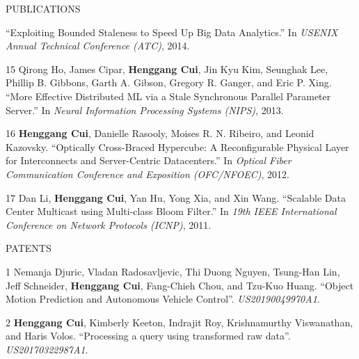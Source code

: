 \documentclass{resume} %
\begin{document}
\begin{rSection}{PUBLICATIONS}
{        ``Exploiting Bounded Staleness to Speed Up Big Data Analytics.''
        In \emph{USENIX Annual Technical Conference (ATC)}, 2014.
    \item
    [15]
        Qirong Ho, James Cipar, {\bf Henggang Cui}, Jin Kyu Kim, Seunghak Lee, Phillip B. Gibbons, Garth A. Gibson, Gregory R. Ganger, and Eric P. Xing.
        ``More Effective Distributed ML via a Stale Synchronous Parallel Parameter Server.''
        In \emph{Neural Information Processing Systems (NIPS)}, 2013.
    \item
    [16]
        {\bf Henggang Cui}, Danielle Rasooly, Moises R. N. Ribeiro, and Leonid Kazovsky.
        ``Optically Cross-Braced Hypercube: A Reconfigurable Physical Layer for Interconnects and Server-Centric Datacenters.''
        In \emph{Optical Fiber Communication Conference and Exposition (OFC/NFOEC)}, 2012.
    \item
    [17]
        Dan Li, {\bf Henggang Cui}, Yan Hu, Yong Xia, and Xin Wang.
        ``Scalable Data Center Multicast using Multi-class Bloom Filter.''
        In \emph{19th IEEE International Conference on Network Protocols (ICNP)}, 2011.
}
\end{rSection}
\vspace{-.05in}



\begin{rSection}{PATENTS}
\vspace{-.1in}
\small{
    \item
    [1]
        Nemanja Djuric, Vladan Radosavljevic, Thi Duong Nguyen, Tsung-Han Lin, Jeff Schneider, {\bf Henggang Cui}, Fang-Chieh Chou, and Tzu-Kuo Huang.
        ``Object Motion Prediction and Autonomous Vehicle Control''.
        \emph{US20190049970A1}.
    \item
    [2]
        {\bf Henggang Cui}, Kimberly Keeton, Indrajit Roy, Krishnamurthy Viswanathan, and Haris Volos.
        ``Processing a query using transformed raw data''.
        \emph{US20170322987A1}.
}
\end{rSection}
\vspace{-.05in}
\end{document}
